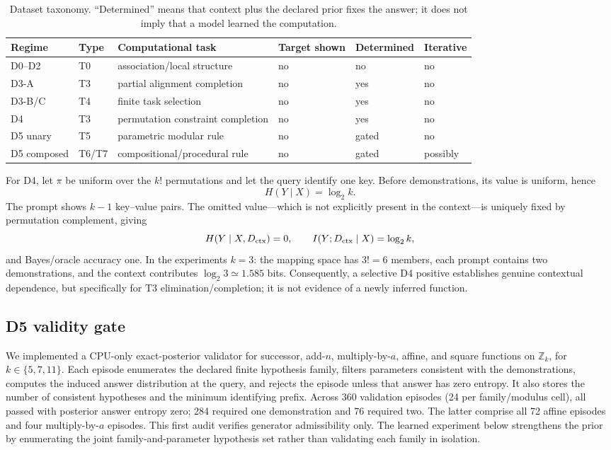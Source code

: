 \documentclass[10pt]{article}
\begin{document}
\begin{table}[H]\centering\small
\caption{Dataset taxonomy. ``Determined'' means that context plus the declared prior fixes the answer; it does not imply that a model learned the computation.}\label{tab:taxonomy}
\begin{tabular}{llllll}\toprule
Regime & Type & Computational task & Target shown & Determined & Iterative\\\midrule
D0--D2 & T0 & association/local structure & no & no & no\\
D3-A & T3 & partial alignment completion & no & yes & no\\
D3-B/C & T4 & finite task selection & no & yes & no\\
D4 & T3 & permutation constraint completion & no & yes & no\\
D5 unary & T5 & parametric modular rule & no & gated & no\\
D5 composed & T6/T7 & compositional/procedural rule & no & gated & possibly\\\bottomrule
\end{tabular}
\end{table}

For D4, let \(\pi\) be uniform over the \(k!\) permutations and let the query identify one key. Before demonstrations, its value is uniform, hence
\[
H(Y\mid X)=\log_2 k.
\]
The prompt shows \(k-1\) key--value pairs. The omitted value---which is not explicitly present in the context---is uniquely fixed by permutation complement, giving
\[
H(Y\mid X,D_{\rm ctx})=0,\qquad
I(Y;D_{\rm ctx}\mid X)=\log_2 k,
\]
and Bayes/oracle accuracy one. In the experiments \(k=3\): the mapping space has \(3!=6\) members, each prompt contains two demonstrations, and the context contributes \(\log_2 3\simeq1.585\) bits. Consequently, a selective D4 positive establishes genuine contextual dependence, but specifically for T3 elimination/completion; it is not evidence of a newly inferred function.

\subsection{D5 validity gate}
We implemented a CPU-only exact-posterior validator for successor, add-\(n\), multiply-by-\(a\), affine, and square functions on \(\mathbb Z_k\), for \(k\in\{5,7,11\}\). Each episode enumerates the declared finite hypothesis family, filters parameters consistent with the demonstrations, computes the induced answer distribution at the query, and rejects the episode unless that answer has zero entropy. It also stores the number of consistent hypotheses and the minimum identifying prefix. Across 360 validation episodes (24 per family/modulus cell), all passed with posterior answer entropy zero; 284 required one demonstration and 76 required two. The latter comprise all 72 affine episodes and four multiply-by-\(a\) episodes. This first audit verifies generator admissibility only. The learned experiment below strengthens the prior by enumerating the joint family-and-parameter hypothesis set rather than validating each family in isolation.
\end{document}
